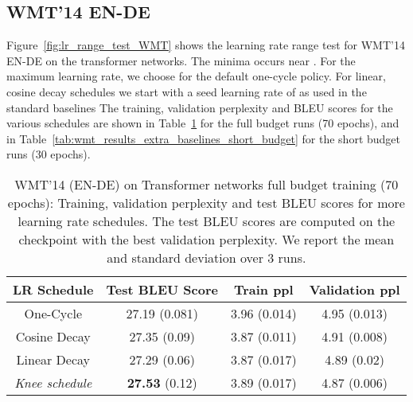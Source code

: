 \documentclass[twoside,11pt]{article}
\newcommand{\lrschedule}{\textit{Knee schedule}}
\begin{document}
\subsection{WMT'14 EN-DE}
Figure~\ref{fig:lr_range_test_WMT} shows the learning rate range test for WMT'14 EN-DE on the transformer networks. The minima occurs near . For the maximum learning rate, we choose  for the default one-cycle policy. For linear, cosine decay schedules we start with a seed learning rate of  as used in the standard baselines The training, validation perplexity and BLEU scores for the various schedules are shown in Table~\ref{tab:wmt_results_extra_baselines_full_budget} for the full budget runs (70 epochs), and in Table~\ref{tab:wmt_results_extra_baselines_short_budget} for the short budget runs (30 epochs).

\begin{table}[h]
\small
\centering
\caption{WMT'14 (EN-DE) on Transformer networks full budget training (70 epochs): Training, validation perplexity and test BLEU scores for more learning rate schedules. The test BLEU scores are computed on the checkpoint with the best validation perplexity. We report the mean and standard deviation over 3 runs.}
\label{tab:wmt_results_extra_baselines_full_budget}
\begin{tabular}{cccc}
  \toprule
  LR Schedule   & Test BLEU Score  & Train ppl & Validation ppl   \\ 
  \midrule 
  One-Cycle     &  27.19 (0.081)    & 3.96 (0.014)  & 4.95 (0.013)     \\
  Cosine Decay  &  27.35 (0.09)     & 3.87 (0.011)   & 4.91 (0.008)   \\
  Linear Decay  &  27.29 (0.06)     & 3.87 (0.017)   & 4.89 (0.02)   \\
  \lrschedule{} & \textbf{27.53} (0.12)      & 3.89 (0.017)   & 4.87 (0.006)    \\ 
  \bottomrule
\end{tabular}

\end{table}
\end{document}
